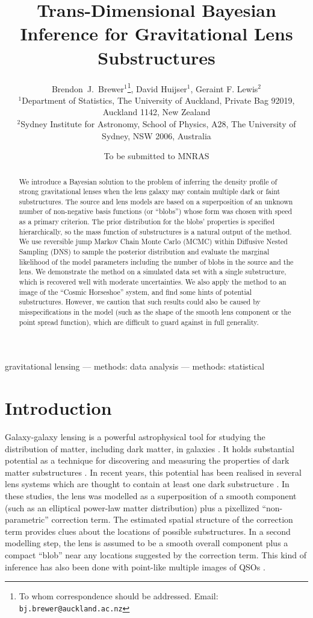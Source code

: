 \documentclass[useAMS,usenatbib]{mn2e}
\title[]
{Trans-Dimensional Bayesian Inference for Gravitational Lens Substructures}
\author[Brewer, Huijser and Lewis]{%
  Brendon~J.~Brewer$^{1}$\thanks{To whom correspondence should be addressed. Email: {\tt bj.brewer@auckland.ac.nz}},
  David Huijser$^{1}$,
  Geraint F. Lewis$^2$
  \medskip\\
  $^1$Department of Statistics, The University of Auckland, Private Bag 92019, Auckland 1142, New Zealand\\
  $^2$Sydney Institute for Astronomy, School of Physics, A28,
  The University of Sydney, NSW 2006, Australia}
\begin{document}
             
\date{To be submitted to MNRAS}
             
\maketitle

\label{firstpage}

\begin{abstract}
We introduce a Bayesian solution to the problem of inferring the density
profile of strong gravitational lenses when the lens galaxy may contain
multiple dark or faint substructures. The source and lens models are based on
a superposition of an unknown number of non-negative basis functions
(or ``blobs'') whose form was chosen with speed as a primary criterion.
The prior distribution for the blobs' properties is specified hierarchically,
so the mass function of substructures is a natural output of the method.
We use reversible
jump Markov Chain Monte Carlo (MCMC) within Diffusive Nested Sampling (DNS) to
sample the posterior distribution and evaluate the marginal likelihood of the
model parameters including the number of blobs in the source and the lens.
We demonstrate the method on a simulated data set with a single
substructure, which is recovered well with moderate uncertainties. We also
apply the method to an image of the ``Cosmic Horseshoe'' system, and find some
hints of potential substructures. However, we caution that such results could
also be caused by misspecifications in the model (such as the shape of
the smooth lens component or the point spread function),
which are difficult to guard against in full generality.
\end{abstract}


\begin{keywords}
gravitational lensing --- methods: data analysis --- methods: statistical
\end{keywords}

\section{Introduction}
Galaxy-galaxy lensing is a powerful astrophysical tool for studying
the distribution of matter, including dark matter, in galaxies
\citep{treu}. It holds substantial potential as a technique for discovering
and measuring the properties of dark matter substructures \citep{koopmans}.
In recent years, this potential has been realised in several lens systems
which are thought to contain at least one dark substructure
\citep{vegetti1, vegetti2, vegetti3}. In these studies, the lens was modelled
as a superposition of a smooth component (such as an elliptical power-law
matter distribution) plus a pixellized ``non-parametric'' correction term.
The estimated spatial structure of the correction term provides clues about
the locations of possible substructures. In a second modelling step, the lens
is assumed to be a smooth overall component plus a compact ``blob'' near any
locations suggested by the correction term. This kind of inference has also
been done with point-like multiple images of QSOs \citep{2012MNRAS.419..936F}.
\end{document}
